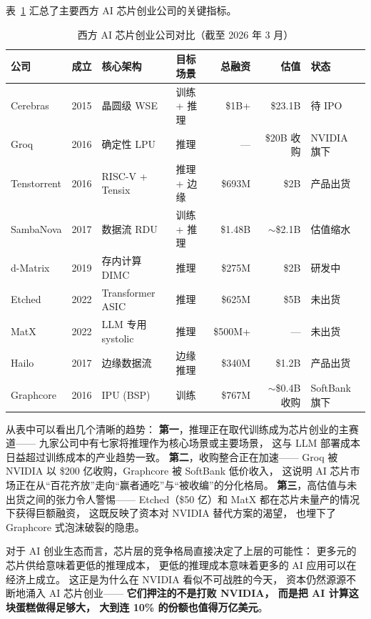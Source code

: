 表~\ref{tab:west-chips-comparison} 汇总了主要西方 AI 芯片创业公司的关键指标。

\begin{table}[htbp]
\centering
\caption{西方 AI 芯片创业公司对比（截至 2026 年 3 月）}
\label{tab:west-chips-comparison}
\small
\begin{tabularx}{\textwidth}{@{}l l l l r r l@{}}
\toprule
\rowcolor{figLightGray}
\textbf{公司} & \textbf{成立} & \textbf{核心架构} & \textbf{目标场景} &
  \textbf{总融资} & \textbf{估值} & \textbf{状态} \\
\midrule
Cerebras     & 2015 & 晶圆级 WSE         & 训练 + 推理   & \$1B+  & \$23.1B & 待 IPO \\
Groq         & 2016 & 确定性 LPU         & 推理          & ---    & \$20B 收购 & NVIDIA 旗下 \\
Tenstorrent  & 2016 & RISC-V + Tensix    & 推理 + 边缘   & \$693M & \$2B    & 产品出货 \\
SambaNova    & 2017 & 数据流 RDU         & 训练 + 推理   & \$1.48B & $\sim$\$2.1B & 估值缩水 \\
d-Matrix     & 2019 & 存内计算 DIMC      & 推理          & \$275M & \$2B    & 研发中 \\
Etched       & 2022 & Transformer ASIC   & 推理          & \$625M & \$5B    & 未出货 \\
MatX         & 2022 & LLM 专用 systolic  & 推理          & \$500M+ & ---    & 未出货 \\
Hailo        & 2017 & 边缘数据流         & 边缘推理      & \$340M & \$1.2B  & 产品出货 \\
Graphcore    & 2016 & IPU (BSP)          & 训练          & \$767M & $\sim$\$0.4B 收购 & SoftBank 旗下 \\
\bottomrule
\end{tabularx}
\end{table}

从表中可以看出几个清晰的趋势：
\textbf{第一}，推理正在取代训练成为芯片创业的主赛道——
九家公司中有七家将推理作为核心场景或主要场景，
这与 LLM 部署成本日益超过训练成本的产业趋势一致。
\textbf{第二}，收购整合正在加速——
Groq 被 NVIDIA 以 \$200 亿收购，Graphcore 被 SoftBank 低价收入，
这说明 AI 芯片市场正在从``百花齐放''走向``赢者通吃''与``被收编''的分化格局。
\textbf{第三}，高估值与未出货之间的张力令人警惕——
Etched（\$50 亿）和 MatX 都在芯片未量产的情况下获得巨额融资，
这既反映了资本对 NVIDIA 替代方案的渴望，
也埋下了 Graphcore 式泡沫破裂的隐患。

对于 AI 创业生态而言，芯片层的竞争格局直接决定了上层的可能性：
更多元的芯片供给意味着更低的推理成本，
更低的推理成本意味着更多的 AI 应用可以在经济上成立。
这正是为什么在 NVIDIA 看似不可战胜的今天，
资本仍然源源不断地涌入 AI 芯片创业——
\textbf{它们押注的不是打败 NVIDIA，
而是把 AI 计算这块蛋糕做得足够大，
大到连 10\% 的份额也值得万亿美元}。

